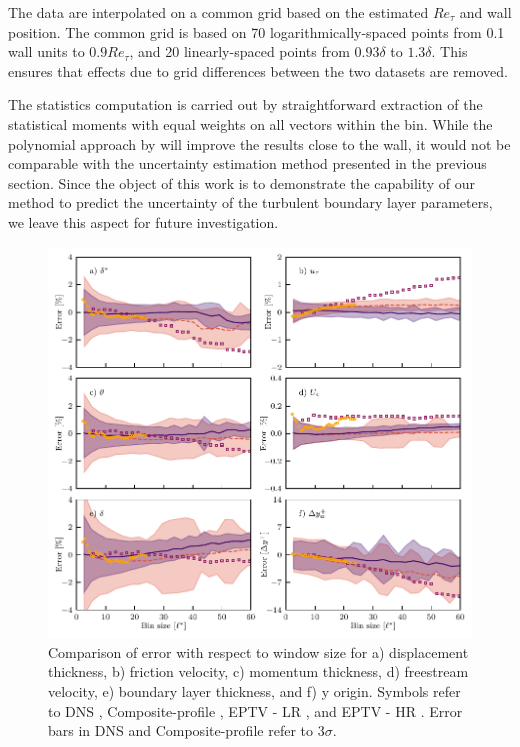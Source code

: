 The data are interpolated on a common grid based on the estimated $Re_\tau$ and wall position. The common grid is based on 70 logarithmically-spaced points from 0.1 wall units to {$0.9Re_\tau$},
and 20 linearly-spaced points from $0.93\delta$ to $1.3\delta$. This ensures that effects due to grid differences between the two datasets are removed.

The statistics computation is carried out by straightforward extraction of the statistical moments with equal weights on all vectors within the bin. While the polynomial approach by \citet{aguera2016ensemble} will improve the results close to the wall, it would not be comparable with the uncertainty estimation method presented in the previous section. Since the object of this work is to demonstrate the capability of our method to predict the uncertainty of the turbulent boundary layer parameters, we leave this aspect for future investigation.


\begin{figure}
    \centering
    \includegraphics[width=\textwidth]{Figures/figure11.pdf}
    \caption{Comparison of error with respect to window size for a) displacement thickness, b) friction velocity, c) momentum thickness, d) freestream velocity, e) boundary layer thickness, and f) y origin. Symbols refer to DNS , {Composite-profile} , EPTV - LR , and EPTV - HR . Error bars in DNS and {Composite-profile} refer to 3$\sigma$.}
    \label{fig:fig01}
\end{figure}


